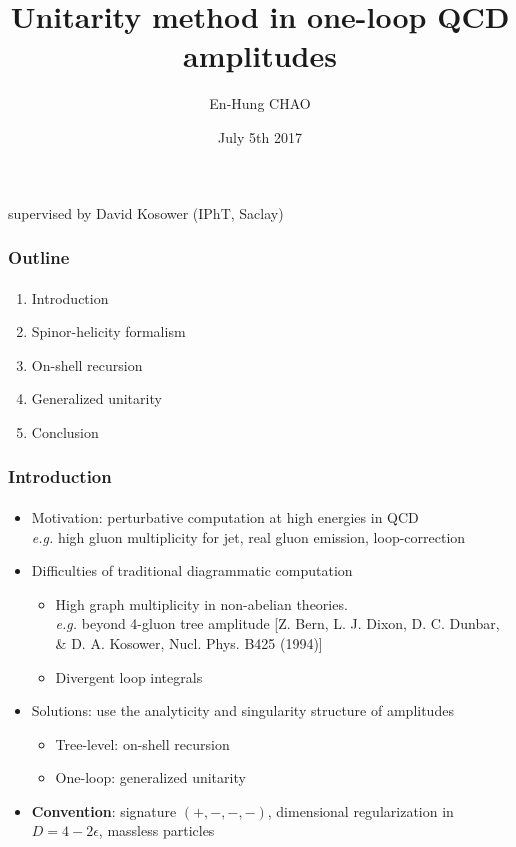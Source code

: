 \documentclass[english]{beamer}
\title{Unitarity method in one-loop QCD amplitudes}
\author{En-Hung CHAO}
\institute{{\'E}cole Normale Sup{\'e}rieure}
\date{July 5th 2017}
\newcommand{\eg}{\textit{e.g. }}
\begin{document}

\begin{frame}
\titlepage%
\centerline{supervised by David Kosower (IPhT, Saclay)}
\end{frame}
\begin{frame}
\frametitle{Outline}
\framesubtitle{}

\begin{enumerate}

\item Introduction
\item Spinor-helicity formalism
\item On-shell recursion
\item Generalized unitarity
\item Conclusion

\end{enumerate}

\end{frame}
\begin{frame}
\frametitle{Introduction}
\framesubtitle{}

\begin{itemize}
\item<1-> Motivation: perturbative computation at high energies in QCD \\ \eg high gluon multiplicity for jet, real gluon emission, loop-correction
\item<2-> Difficulties of traditional diagrammatic computation
    \begin{itemize}
    \item<3-> High graph multiplicity in non-abelian theories. \\ \eg beyond 4-gluon tree amplitude \tiny\color{blue}[Z. Bern, L. J. Dixon, D. C. Dunbar, \& D. A. Kosower, Nucl. Phys. B425 (1994)]\color{black}\normalsize
    \item<4-> Divergent loop integrals
    \end{itemize}
\item<5-> Solutions: use the analyticity and singularity structure of amplitudes
    \begin{itemize}
    \item<6-> Tree-level: on-shell recursion
    \item<7-> One-loop: generalized unitarity
    \end{itemize}
\item<8-> \textbf{Convention}: signature $(+,-,-,-)$, dimensional regularization in $D=4-2\epsilon$, massless particles
\end{itemize}
\end{frame}
\end{document}
